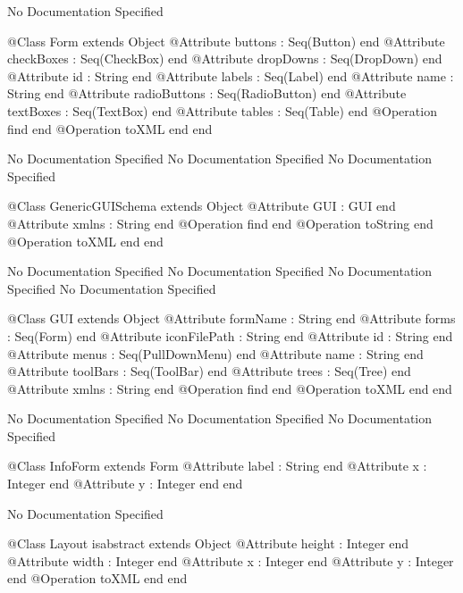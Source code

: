No Documentation Specified
\begin{Interface}
@Class Form extends Object
  @Attribute buttons : Seq(Button) end
  @Attribute checkBoxes : Seq(CheckBox) end
  @Attribute dropDowns : Seq(DropDown) end
  @Attribute id : String end
  @Attribute labels : Seq(Label) end
  @Attribute name : String end
  @Attribute radioButtons : Seq(RadioButton) end
  @Attribute textBoxes : Seq(TextBox) end
  @Attribute tables : Seq(Table) end
  @Operation find end
  @Operation toXML end
end
\end{Interface}
No Documentation Specified
No Documentation Specified
No Documentation Specified
\begin{Interface}
@Class GenericGUISchema extends Object
  @Attribute GUI : GUI end
  @Attribute xmlns : String end
  @Operation find end
  @Operation toString end
  @Operation toXML end
end
\end{Interface}
No Documentation Specified
No Documentation Specified
No Documentation Specified
No Documentation Specified
\begin{Interface}
@Class GUI extends Object
  @Attribute formName : String end
  @Attribute forms : Seq(Form) end
  @Attribute iconFilePath : String end
  @Attribute id : String end
  @Attribute menus : Seq(PullDownMenu) end
  @Attribute name : String end
  @Attribute toolBars : Seq(ToolBar) end
  @Attribute trees : Seq(Tree) end
  @Attribute xmlns : String end
  @Operation find end
  @Operation toXML end
end
\end{Interface}
No Documentation Specified
No Documentation Specified
No Documentation Specified
\begin{Interface}
@Class InfoForm extends Form
  @Attribute label : String end
  @Attribute x : Integer end
  @Attribute y : Integer end
end
\end{Interface}
No Documentation Specified
\begin{Interface}
@Class Layout isabstract extends Object
  @Attribute height : Integer end
  @Attribute width : Integer end
  @Attribute x : Integer end
  @Attribute y : Integer end
  @Operation toXML end
end
\end{Interface}
